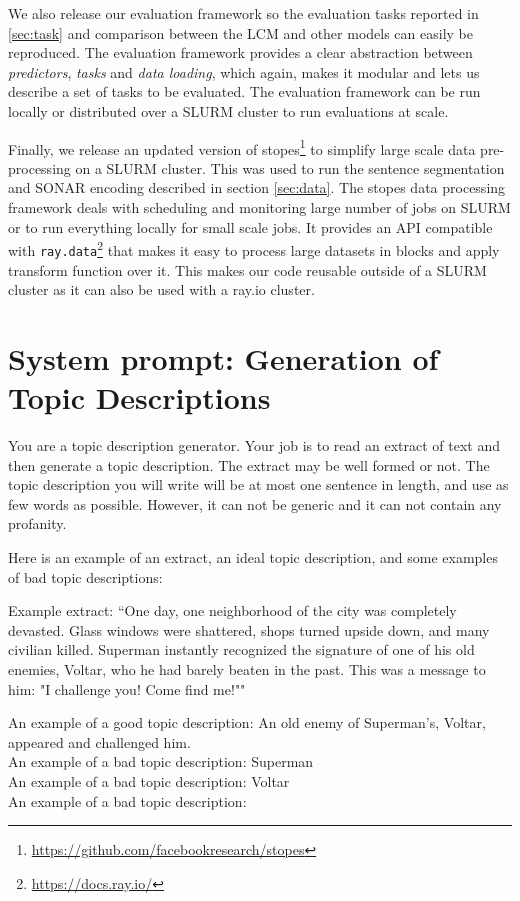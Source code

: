 \documentclass[twoside,11pt]{fairmeta}
\newcommand{\sonar}{\textsc{SONAR}\xspace}
\newcommand{\lcm}{\textsc{LCM}\xspace}
\newcommand{\stopesgithub}{\url{https://github.com/facebookresearch/stopes}}
\begin{document}
We also release our evaluation framework so the evaluation tasks reported in \ref{sec:task} and comparison between the \lcm and other models can easily be reproduced. The evaluation framework provides a clear abstraction between \emph{predictors}, \emph{tasks} and \emph{data loading}, which again, makes it modular and lets us describe a set of tasks to be evaluated. The evaluation framework can be run locally or distributed over a SLURM cluster to run evaluations at scale.

Finally, we release an updated version of stopes\footnote{\stopesgithub} to simplify large scale data pre-processing on a SLURM cluster. This was used to run the sentence segmentation and \sonar encoding described in section \ref{sec:data}. The stopes data processing framework deals with scheduling and monitoring large number of jobs on SLURM or to run everything locally for small scale jobs. It provides an API compatible with \texttt{ray.data}\footnote{\url{https://docs.ray.io/}} that makes it easy to process large datasets in blocks and apply transform function over it. This makes our code reusable outside of a SLURM cluster as it can also be used with a ray.io cluster.\section{System prompt: Generation of Topic Descriptions}
\label{sec:prompt_generation_of_topic_descriptions}

You are a topic description generator.
Your job is to read an extract of text and then generate a topic description.
The extract may be well formed or not.
The topic description you will write will be at most one sentence in length, and use as few words as possible.
However, it can not be generic and it can not contain any profanity.

Here is an example of an extract, an ideal topic description, and some examples of bad topic descriptions:

Example extract: “One day, one neighborhood of the city was completely devasted. Glass windows were shattered, shops turned upside down, and many civilian killed. Superman instantly recognized the signature of one of his old enemies, Voltar, who he had barely beaten in the past. This was a message to him: "I challenge you! Come find me!""

An example of a good topic description: An old enemy of Superman's, Voltar, appeared and challenged him.\\
An example of a bad topic description: Superman\\
An example of a bad topic description: Voltar\\
An example of a bad topic description:
\end{document}
